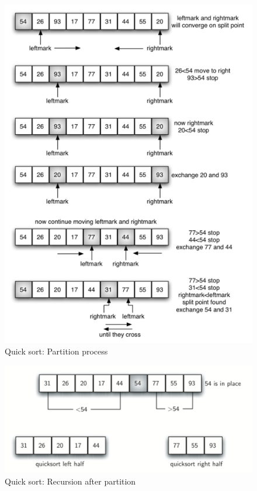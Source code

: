 \documentclass[a4paper,11pt]{book}
\begin{document}
\begin{figure}[ht]
	\centering
	\includegraphics[scale=1.2]{code/sort/pic/partitionA.png}
	\caption{Quick sort: Partition process}
\end{figure}

\begin{figure}[ht]
	\centering
	\includegraphics[scale=1.2]{code/sort/pic/partitionB.png}
	\caption{Quick sort: Recursion after partition}
\end{figure}
\end{document}
